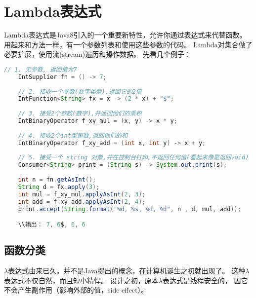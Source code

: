 \chapter{Lambda表达式}
\label{chap:java_lambda}

Lambda表达式是Java8引入的一个重要新特性，允许你通过表达式来代替函数。
用起来和方法一样，有一个参数列表和使用这些参数的代码。
Lambda对集合做了必要扩展，使用流(stream)遍历和操作数据。
先看几个例子：\vspace{0.3cm}

\begin{lstlisting}[language=Java]
	// 1. 无参数, 返回值为7
	IntSupplier fn = () -> 7;
	
	// 2. 接收一个参数(数字类型),返回它的2倍
	IntFunction<String> fx = x -> (2 * x) + "$";
	
	// 3. 接受2个参数(数字),并返回他们的乘积
	IntBinaryOperator f_xy_mul = (x, y) -> x * y;
	
	// 4. 接收2个int型整数,返回他们的和
	IntBinaryOperator f_xy_add = (int x, int y) -> x + y;
	
	// 5. 接受一个 string 对象,并在控制台打印,不返回任何值(看起来像是返回void)
	Consumer<String> print = (String s) -> System.out.print(s);
	
	int n = fn.getAsInt();
	String d = fx.apply(3);
	int mul = f_xy_mul.applyAsInt(2, 3);
	int add = f_xy_add.applyAsInt(2, 4);
	print.accept(String.format("%d, %s, %d, %d", n , d, mul, add));

	\\输出： 7, 6$, 6, 6
\end{lstlisting}

\section{函数分类}

$\lambda$表达式由来已久，并不是Java提出的概念，在计算机诞生之初就出现了。
这种$\lambda$表达式不仅自然，而且短小精悍。
设计之初，原本$\lambda$表达式是线程安全的，
因它不会产生副作用（影响外部的值，side effect）。

